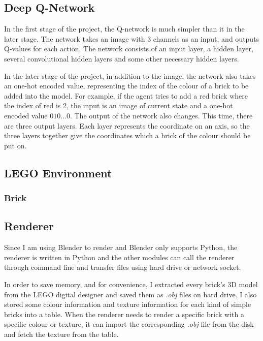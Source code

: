 \documentclass[a4paper]{article}
\begin{document}
        		\newpage
        		
        		
        
        \subsection{Deep Q-Network}
            
            In the first stage of the project, the Q-network is much simpler than it in the later stage. The network takes an image with 3 channels as an input, and outputs Q-values for each action. The network consists of an input layer, a hidden layer, several convolutional hidden layers and some other necessary hidden layers. 
            
            In the later stage of the project, in addition to the image, the network also takes an one-hot encoded value, representing the index of the colour of a brick to be added into the model. For example, if the agent tries to add a red brick where the index of red is 2, the input is an image of current state and a one-hot encoded value $010...0$. The output of the network also changes. This time, there are three output layers. Each layer represents the coordinate on an axis, so the three layers together give the coordinates which a brick of the colour should be put on. 
        
        
        \subsection{LEGO Environment}
        
        	\subsubsection{Brick}
        
        
        \subsection{Renderer}
        
            Since I am using Blender to render and Blender only supports Python, the renderer is written in Python and the other modules can call the renderer through command line and transfer files using hard drive or network socket. 
            
            In order to save memory, and for convenience, I extracted every brick's 3D model from the LEGO digital designer and saved them as \textit{.obj} files on hard drive. I also stored some colour information and texture information for each kind of simple bricks into a table. When the renderer needs to render a specific brick with a specific colour or texture, it can import the corresponding \textit{.obj} file from the disk and fetch the texture from the table. 
            
\end{document}
